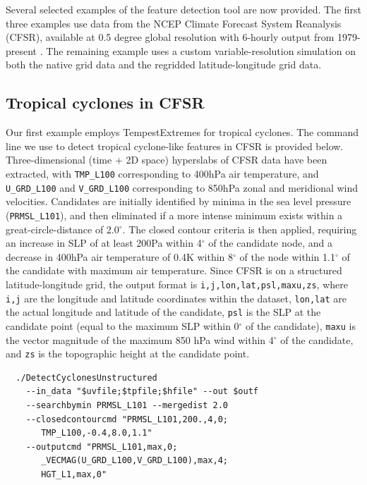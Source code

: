 \documentclass[gmdd, hvmath, online]{copernicus_discussions}
\begin{document}
Several selected examples of the feature detection tool are now provided.  The first three examples use data from the NCEP Climate Forecast System Reanalysis (CFSR), available at 0.5 degree global resolution with 6-hourly output from 1979-present \citep{saha2010ncep}.  The remaining example uses a custom variable-resolution simulation \citep{zarzycki2014multidecadal} on both the native grid data and the regridded latitude-longitude grid data.

\subsection{Tropical cyclones in CFSR} \label{sec:TropicalCycloneExample}

Our first example employs TempestExtremes for tropical cyclones.  The command line we use to detect tropical cyclone-like features in CFSR is provided below.  Three-dimensional (time + 2D space) hyperslabs of CFSR data have been extracted, with \texttt{TMP\_L100} corresponding to 400hPa air temperature, and \texttt{U\_GRD\_L100} and \texttt{V\_GRD\_L100} corresponding to 850hPa zonal and meridional wind velocities. Candidates are initially identified by minima in the sea level pressure (\texttt{PRMSL\_L101}), and then eliminated if a more intense minimum exists within a great-circle-distance of 2.0$^\circ$.  The closed contour criteria is then applied, requiring an increase in SLP of at least 200Pa within 4$^\circ$ of the candidate node, and a decrease in 400hPa air temperature of 0.4K within 8$^\circ$ of the node within 1.1$^\circ$ of the candidate with maximum air temperature. Since CFSR is on a structured latitude-longitude grid, the output format is \texttt{i,j,lon,lat,psl,maxu,zs}, where \texttt{i,j} are the longitude and latitude coordinates within the dataset, \texttt{lon,lat} are the actual longitude and latitude of the candidate, \texttt{psl} is the SLP at the candidate point (equal to the maximum SLP within 0$^\circ$ of the candidate), \texttt{maxu} is the vector magnitude of the maximum 850 hPa wind within 4$^\circ$ of the candidate, and \texttt{zs} is the topographic height at the candidate point.

{\small \begin{verbatim}
  ./DetectCyclonesUnstructured
    --in_data "$uvfile;$tpfile;$hfile" --out $outf
    --searchbymin PRMSL_L101 --mergedist 2.0
    --closedcontourcmd "PRMSL_L101,200.,4,0;
       TMP_L100,-0.4,8.0,1.1"
    --outputcmd "PRMSL_L101,max,0;
       _VECMAG(U_GRD_L100,V_GRD_L100),max,4;
       HGT_L1,max,0"
\end{verbatim}}
\end{document}
